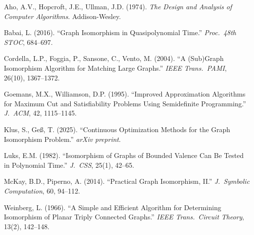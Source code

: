 \documentclass[12pt,a4paper]{article}
\begin{document}
\begin{enumerate}[label={[\arabic*]},nosep]
  \item Aho, A.V., Hopcroft, J.E., Ullman, J.D. (1974). \emph{The Design and
        Analysis of Computer Algorithms}. Addison-Wesley.
  \item Babai, L. (2016). ``Graph Isomorphism in Quasipolynomial Time.''
        \emph{Proc.\ 48th STOC}, 684--697.
  \item Cordella, L.P., Foggia, P., Sansone, C., Vento, M. (2004).
        ``A (Sub)Graph Isomorphism Algorithm for Matching Large Graphs.''
        \emph{IEEE Trans.\ PAMI}, 26(10), 1367--1372.
  \item Goemans, M.X., Williamson, D.P. (1995). ``Improved Approximation
        Algorithms for Maximum Cut and Satisfiability Problems Using
        Semidefinite Programming.'' \emph{J.\ ACM}, 42, 1115--1145.
  \item Klus, S., Ge\ss{}, T. (2025). ``Continuous Optimization Methods for
        the Graph Isomorphism Problem.'' \emph{arXiv preprint}.
  \item Luks, E.M. (1982). ``Isomorphism of Graphs of Bounded Valence Can Be
        Tested in Polynomial Time.'' \emph{J.\ CSS}, 25(1), 42--65.
  \item McKay, B.D., Piperno, A. (2014). ``Practical Graph Isomorphism, II.''
        \emph{J.\ Symbolic Computation}, 60, 94--112.
  \item Weinberg, L. (1966). ``A Simple and Efficient Algorithm for
        Determining Isomorphism of Planar Triply Connected Graphs.''
        \emph{IEEE Trans.\ Circuit Theory}, 13(2), 142--148.
\end{enumerate}
\end{document}
